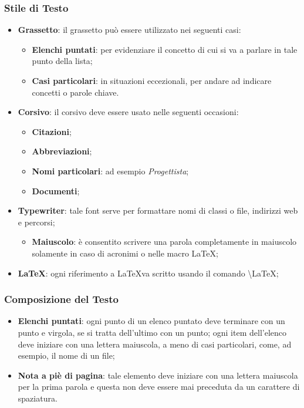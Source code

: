 \subsubsection{Stile di Testo}
\begin{itemize}
\item \textbf{Grassetto}: il grassetto può essere utilizzato nei seguenti casi:
\begin{itemize}
\item \textbf{Elenchi puntati}: per evidenziare il concetto di cui si va a parlare in tale punto della lista;
\item \textbf{Casi particolari}: in situazioni eccezionali, per andare ad indicare concetti o parole chiave.
\end{itemize}
\item \textbf{Corsivo}: il corsivo deve essere usato nelle seguenti occasioni:
\begin{itemize}
\item \textbf{Citazioni};
\item \textbf{Abbreviazioni};
\item \textbf{Nomi particolari}: ad esempio \textit{Progettista};
\item \textbf{Documenti};
\end{itemize}
\item \textbf{Typewriter}: tale font serve per formattare nomi di classi o file, indirizzi web e percorsi;
\begin{itemize}
\item \textbf{Maiuscolo}: è consentito scrivere una parola completamente in maiuscolo solamente in caso di acronimi o nelle macro \LaTeX;
\end{itemize}
\item \textbf{\LaTeX}: ogni riferimento a \LaTeX va scritto usando il comando \textbackslash{LaTeX};
\end{itemize}

\subsubsection{Composizione del Testo}
\begin{itemize}
\item \textbf{Elenchi puntati}: ogni punto di un elenco puntato deve terminare con un punto e virgola, se si tratta dell'ultimo con un punto; ogni item dell'elenco deve iniziare con una lettera maiuscola, a meno di casi particolari, come, ad esempio, il nome di un file;
\item \textbf{Nota a piè di pagina}: tale elemento deve iniziare con una lettera maiuscola per la prima parola e questa non deve essere mai preceduta da un carattere di spaziatura. 
\end{itemize}

